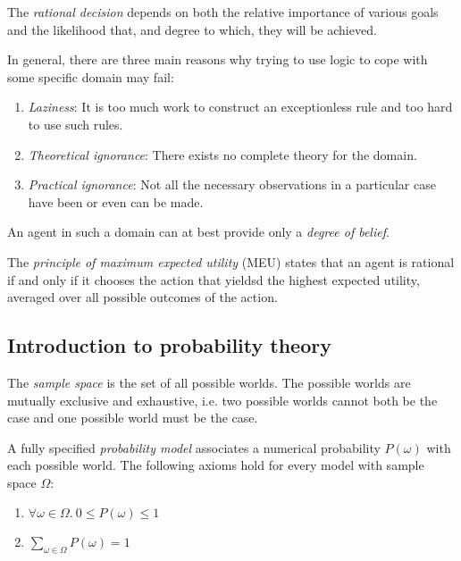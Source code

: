 \documentclass{article}
\begin{document}
\begin{definition}[R\&N p. 481]
    The \emph{rational decision} depends on both the relative importance of various goals and the
    likelihood that, and degree to which, they will be achieved.
\end{definition}

\begin{theorem}
    In general, there are three main reasons why trying to use logic
    to cope with some specific domain may fail:
    \begin{enumerate}
        \item \emph{Laziness}: It is too much work to construct an 
        exceptionless rule and too hard to use such rules.
        \item \emph{Theoretical ignorance}: There exists no complete theory for the domain.
        \item \emph{Practical ignorance}: Not all the necessary observations 
        in a particular case have been or even can be made.
    \end{enumerate}
    An agent in such a domain can at best provide only a \emph{degree of belief}.
\end{theorem}

\begin{definition}
    The \emph{principle of maximum expected utility} (MEU) states that an agent is rational
    if and only if it chooses the action that yieldsd the highest expected utility,
    averaged over all possible outcomes of the action. 
\end{definition}

\subsection{Introduction to probability theory}

\renewcommand{\P}{\mathbf{P}}
\renewcommand{\vec}[1]{\mathbf{#1}}

\begin{definition}[R\&N p. 484]
    The \emph{sample space} is the set of all possible worlds.
    The possible worlds are mutually exclusive and exhaustive, i.e.
    two possible worlds cannot both be the case and one possible world must
    be the case.
\end{definition}

\begin{definition}
    A fully specified \emph{probability model} associates a numerical probability
    $P(\omega)$ with each possible world. The following axioms hold for every
    model with sample space $\Omega$:
    \begin{enumerate}[label=P\arabic*.]
        \item $\forall \omega\in\Omega.\:0\leq P(\omega)\leq 1$
        \item $\sum_{\omega\in\Omega} P(\omega)=1$ 
    \end{enumerate}
\end{definition}
\end{document}

